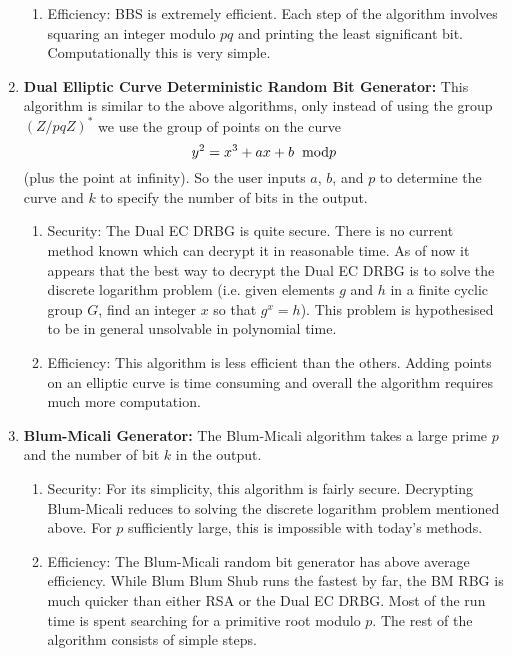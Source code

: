 \documentclass[12pt,reqno]{amsart}
\begin{document}
\begin{enumerate}
\begin{enumerate}
\item
Efficiency: BBS is extremely efficient. Each step of the algorithm involves squaring an integer modulo $pq$ and printing the least significant bit. Computationally this is very simple.

\end{enumerate}

\item
{\bf Dual Elliptic Curve Deterministic Random Bit Generator:} This algorithm is similar to the above algorithms, only instead of using the group $(Z/pqZ)^*$ we use the group of points on the curve
\[
y^2 = x^3 + ax + b \hspace{2mm} \text{mod} p
\]
(plus the point at infinity). So the user inputs $a$, $b$, and $p$ to determine the curve and $k$ to specify the number of bits in the output.

\begin{enumerate}

\item
Security: The Dual EC DRBG is quite secure. There is no current method known which can decrypt it in reasonable time. As of now it appears that the best way to decrypt the Dual EC DRBG is to solve the discrete logarithm problem (i.e. given elements $g$ and $h$ in a finite cyclic group $G$, find an integer $x$ so that $g^x = h$). This problem is hypothesised to be in general unsolvable in polynomial time.

\item
Efficiency: This algorithm is less efficient than the others. Adding points on an elliptic curve is time consuming and overall the algorithm requires much more computation.

\end{enumerate}

\item
{\bf Blum-Micali Generator:} The Blum-Micali algorithm takes a large prime $p$ and the number of bit $k$ in the output.

\begin{enumerate}

\item
Security: For its simplicity, this algorithm is fairly secure. Decrypting Blum-Micali reduces to solving the discrete logarithm problem mentioned above. For $p$ sufficiently large, this is impossible with today's methods.

\item
Efficiency: The Blum-Micali random bit generator has above average efficiency. While Blum Blum Shub runs the fastest by far, the BM RBG is much quicker than either RSA or the Dual EC DRBG. Most of the run time is spent searching for a primitive root modulo $p$. The rest of the algorithm consists of simple steps.


\end{enumerate}
\end{enumerate}
\end{document}
